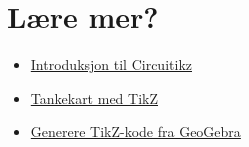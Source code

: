 \documentclass[12pt, a4paper]{article}
\begin{document}
\section*{Lære mer?}
\begin{itemize}
	\item
	\href{https://www.sharelatex.com/blog/2013/09/02/tikz-series-pt4.html}{Introduksjon til Circuitikz}

	\item
	\href{https://www.sharelatex.com/blog/2013/09/04/tikz-series-pt5.html}{Tankekart med TikZ}

	\item
	\href{https://www.sharelatex.com/blog/2013/08/28/tikz-series-pt2.html}{Generere TikZ-kode fra GeoGebra}
\end{itemize}
\end{document}
